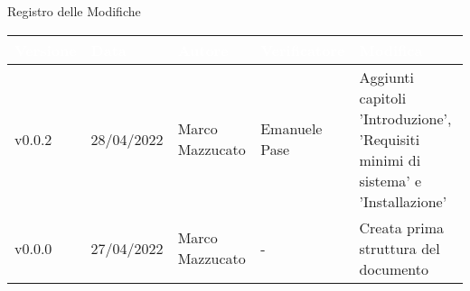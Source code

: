 \begin{center}
  \huge{Registro delle Modifiche}
\end{center}
\renewcommand\arraystretch{1,5}
{\centering
\begin{longtable}{|C{1.8cm}|C{2.1cm}|C{2cm}|C{2.4cm}|L{4.4cm}|}
  \hline
  \textcolor[HTML]{FFFFFF}{\textbf{Versione}} & \textcolor[HTML]{FFFFFF}{\textbf{Data}} & \textcolor[HTML]{FFFFFF}{\textbf{Autore}}  & \textcolor[HTML]{FFFFFF}{\textbf{Verificatore}} & \textcolor[HTML]{FFFFFF}{\textbf{Modifica}}    \\ \hline
  v0.0.2      & 28/04/2022    & Marco Mazzucato   & Emanuele Pase       & Aggiunti capitoli 'Introduzione', 'Requisiti minimi di sistema' e 'Installazione'\\ \hline
  v0.0.0        & 27/04/2022    & Marco Mazzucato   &     -     & Creata prima struttura del documento \\ \hline
\end{longtable}}

\renewcommand\arraystretch{1}

